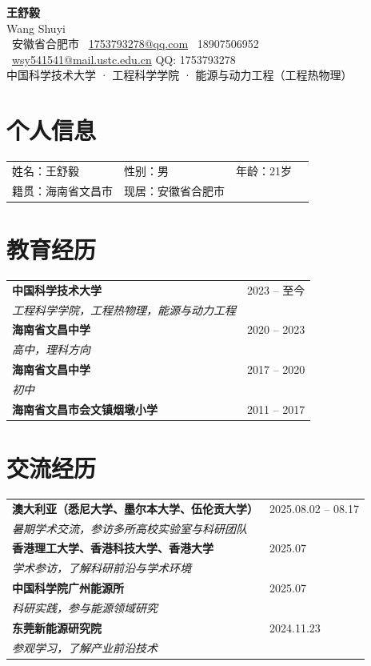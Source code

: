 \documentclass[11pt,a4paper]{article}
\begin{document}
\begin{center}
  {\Huge\bfseries 王舒毅}\\[4pt]
  {\large Wang Shuyi}\\[8pt]
  \faMapMarker\ 安徽省合肥市 \quad
  \faEnvelope\ \href{mailto:1753793278@qq.com}{1753793278@qq.com} \quad
  \faPhone\ 18907506952 \\[2pt]
  \faEnvelope\ \href{mailto:wsy541541@mail.ustc.edu.cn}{wsy541541@mail.ustc.edu.cn} \quad
  QQ: 1753793278 \\[4pt]
  中国科学技术大学 · 工程科学学院 · 能源与动力工程（工程热物理）
\end{center}

\section{个人信息}
\begin{tabular}{llll}
  姓名：王舒毅 & 性别：男 & 年龄：21岁 \\
  籍贯：海南省文昌市 & 现居：安徽省合肥市 \\
\end{tabular}

\section{教育经历}
\begin{tabular}{@{}p{}@{}p{}@{}}
  \textbf{中国科学技术大学} & 2023 -- 至今 \\
  \textit{工程科学学院，工程热物理，能源与动力工程} \\
  \textbf{海南省文昌中学} & 2020 -- 2023 \\
  \textit{高中，理科方向} \\
  \textbf{海南省文昌中学} & 2017 -- 2020 \\
  \textit{初中} \\
  \textbf{海南省文昌市会文镇烟墩小学} & 2011 -- 2017 \\
\end{tabular}

\section{交流经历}
\begin{tabular}{@{}p{}@{}p{}@{}}
  \textbf{澳大利亚（悉尼大学、墨尔本大学、伍伦贡大学）} & 2025.08.02 -- 08.17 \\
  \textit{暑期学术交流，参访多所高校实验室与科研团队} \\
  \textbf{香港理工大学、香港科技大学、香港大学} & 2025.07 \\
  \textit{学术参访，了解科研前沿与学术环境} \\
  \textbf{中国科学院广州能源所} & 2025.07 \\
  \textit{科研实践，参与能源领域研究} \\
  \textbf{东莞新能源研究院} & 2024.11.23 \\
  \textit{参观学习，了解产业前沿技术} \\
\end{tabular}
\end{document}
